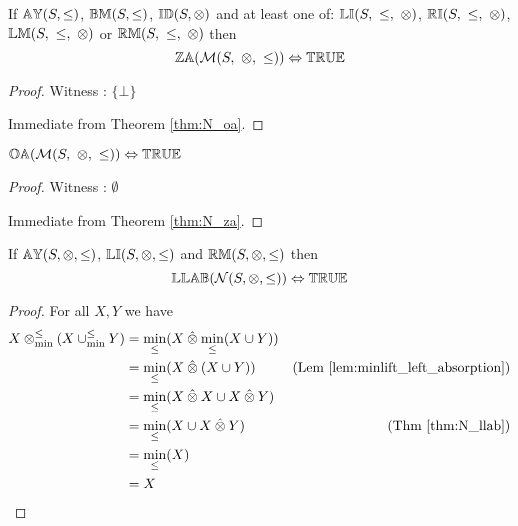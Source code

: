 \begin{theorem} \label{thm:M_za}
If ${\mathbb{AY}}(S,\leq)$, ${\mathbb{BM}}(S,\leq)$, ${\mathbb{ID}}(S,\otimes)$ and at least one of: $\propname{LI}(S,\ \leq,\ \otimes)$, $\propname{RI}(S,\ \leq,\ \otimes)$, $\propname{LM}(S,\ \leq,\ \otimes)$ or $\propname{RM}(S,\ \leq,\ \otimes)$ then
\begin{equation*}
{\mathbb{ZA}}(\mathcal{M}(S,\ \otimes,\ \leq)) \Leftrightarrow {\mathbb{TRUE}}
\end{equation*}
\end{theorem}

\begin{proof}

\vspace{0.5em}
Witness : $\{ \bot \}$

\vspace{0.5em}
Immediate from Theorem \ref{thm:N_oa}.
\end{proof}

\begin{theorem} \label{thm:M_oa}
${\mathbb{OA}}(\mathcal{M}(S,\ \otimes,\ \leq)) \Leftrightarrow {\mathbb{TRUE}}$
\end{theorem}

\begin{proof}

\vspace{0.5em}
Witness : $\emptyset$

\vspace{0.5em}
Immediate from Theorem \ref{thm:N_za}.
\end{proof}

\begin{theorem} \label{thm:M_llab}
If ${\mathbb{AY}}(S,\otimes,\leq)$, ${\mathbb{LI}}(S,\otimes,\leq)$ and ${\mathbb{RM}}(S,\otimes,\leq)$ then
\begin{equation*}
{\mathbb{LLAB}}(\mathcal{N}(S,\otimes,\leq)) \Leftrightarrow {\mathbb{TRUE}}
\end{equation*}
\end{theorem}


\begin{proof}

\vspace{0.5em}
For all $X, Y$ we have
\begin{align*}
X \mathbin{\otimes_{\min}^{\leq}} (X \mathbin{\cup_{\min}^{\leq}} Y) 	& = \min_\leq(X \mathbin{\hat{\otimes}} \min_\leq(X \cup Y) ) \\
							& = \min_\leq( X \mathbin{\hat{\otimes}} (X \cup Y)) & \text{(Lem \ref{lem:minlift_left_absorption})} \\
							& = \min_\leq(X \mathbin{\hat{\otimes}} X \cup X \mathbin{\hat{\otimes}} Y) \\
							& = \min_\leq(X \cup X \mathbin{\hat{\otimes}} Y) & \text{(Thm \ref{thm:N_llab})} \\
							& = \min_\leq(X) \\
							& = X
\end{align*}
\end{proof}



